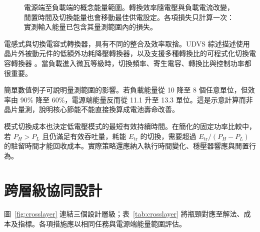 \begin{figure}[htbp]
\centering
{}
\caption{電源端至負載端的概念能量範圍。轉換效率隨電壓與負載電流改變，閒置時間及切換能量也會移動最佳供電設定。各項損失只計算一次：實測輸入能量已包含其量測範圍內的損失。}
\label{fig:energyflow}
\end{figure}

電感式與切換電容式轉換器，具有不同的整合及效率取捨。UDVS 綜述描述使用晶片外被動元件的低額外功耗降壓轉換器，以及支援多種轉換比的可程式化切換電容轉換器 \cite[Sec.~IV]{udvs2010}。當負載進入微瓦等級時，切換頻率、寄生電容、轉換比與控制功率都很重要。

簡單數值例子可說明量測範圍的影響。若負載能量從 10 降至 8 個任意單位，但效率由 90\% 降至 60\%，電源端能量反而從 11.1 升至 13.3 單位。這是示意計算而非晶片量測，說明核心節能不能直接換算成電池壽命改善。

模式切換成本也決定低電壓模式的最短有效持續時間。在簡化的固定功率比較中，若 $P_H>P_L$ 且仍滿足有效吞吐量，耗能 $E_{\mathrm{tr}}$ 的切換，需要超過 $E_{\mathrm{tr}}/(P_H-P_L)$ 的駐留時間才能回收成本。實際策略還應納入執行時間變化、穩壓器響應與閒置行為。

\clearpage
\section{跨層級協同設計}
圖~\ref{fig:crosslayer} 連結三個設計層級；表~\ref{tab:crosslayer} 將瓶頸對應至解法、成本及指標。各項措施應以相同任務與電源端能量範圍評估。

